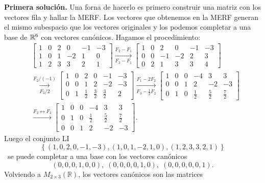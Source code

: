 \begin{enumerate}[resume, topsep=6pt, itemsep=.4cm]
    \textbf{Primera solución.} Una forna de hacerlo es primero construir una matriz con los vectores fila y hallar la MERF. Los vectores que obtenemos en la MERF generan el mismo subespacio que los vectores originales y los podemos completar a una base de $\mathbb R^6$ con vectores canónicos. Hagamos el procedimiento: 
    \begin{align*}
    &\begin{bmatrix}
        1 & 0 & 2 & 0 & -1 & -3\\
        1 & 0 & 1 & -2 & 1 & 0\\
        1 & 2 & 3 & 3 & 2 & 1
    \end{bmatrix}
    \underset{F_3-F_1}{\stackrel{F_2-F_1}{\longrightarrow}}
    \begin{bmatrix}
        1 & 0 & 2 & 0 & -1 & -3\\
        0 & 0 & -1 & -2 & 2 & 3\\
        0 & 2 & 1 & 3 & 3 & 4
    \end{bmatrix} \\
    &\underset{F_3/2}{\stackrel{F_2/(-1)}{\longrightarrow}}
    \begin{bmatrix}
        1 & 0 & 2 & 0 & -1 & -3\\
        0 & 0 & 1 & 2 & -2 & -3\\
        0 & 1 & \frac12 & \frac32 & \frac32 & 2
    \end{bmatrix}
    \underset{F_3-\frac12 F_2}{\stackrel{F_1-2F_2}{\longrightarrow}}
    \begin{bmatrix}
        1 & 0 & 0 & -4 & 3 & 3\\
        0 & 0 & 1 & 2 & -2 & -3\\
        0 & 1 & 0 & \frac12 & \frac52 & \frac72
    \end{bmatrix} \\
    &\stackrel{F_2 \leftrightarrow F_3}{\longrightarrow}
    \begin{bmatrix}
        1 & 0 & 0 & -4 & 3 & 3\\
        0 & 1 & 0 & \frac12 & \frac52 & \frac72\\
        0 & 0 & 1 & 2 & -2 & -3
    \end{bmatrix}.
    \end{align*}
    Luego el conjunto LI
    $$
    \left\{(1, 0, 2, 0, -1, -3), (1, 0, 1, -2, 1, 0),  (1, 2, 3, 3, 2, 1)\right\}
    $$ \
    se puede completar a una base con los vectores canónicos 
    $$(0,0,0,1,0,0),\; (0,0,0,0,1,0),\; (0,0,0,0,0,1).$$
    Volviendo a $M_{2\times 3}(\mathbb{R})$, los vectores canónicos son las matrices

\end{enumerate}
